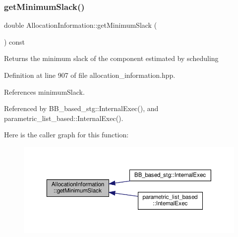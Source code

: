 \subsubsection{\texorpdfstring{get\+Minimum\+Slack()}{getMinimumSlack()}}
{\footnotesize\ttfamily double Allocation\+Information\+::get\+Minimum\+Slack (\begin{DoxyParamCaption}{ }\end{DoxyParamCaption}) const\hspace{0.3cm}{\ttfamily [inline]}}

\begin{DoxyReturn}{Returns}
the minimum slack of the component estimated by scheduling 
\end{DoxyReturn}


Definition at line 907 of file allocation\+\_\+information.\+hpp.



References minimum\+Slack.



Referenced by B\+B\+\_\+based\+\_\+stg\+::\+Internal\+Exec(), and parametric\+\_\+list\+\_\+based\+::\+Internal\+Exec().

Here is the caller graph for this function\+:
\nopagebreak
\begin{figure}[H]
\begin{center}
\leavevmode
\includegraphics[width=350pt]{d7/d79/classAllocationInformation_a3c65f1874a9c81a9aeaaa81867dfc2d0_icgraph}
\end{center}
\end{figure}
\mbox{\label{classAllocationInformation_a5abfaf6d87461a2bb2279e10b700f41f}} 
